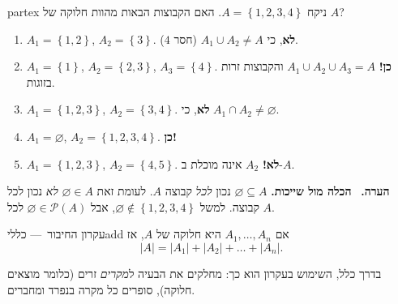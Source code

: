 \documentclass[11pt,a4paper]{report}
\newenvironment{remark}{\par\smallskip\noindent\textsf{\textbf{הערה.}}\ }{\par\smallskip}
\newcommand{\flag}{\tikz[baseline=-0.1ex,x=0.9ex,y=0.9ex]{\draw[line width=0.5pt] (0,-0.3)--(0,1.6); \fill (0,1.6)--(1.2,1.2)--(0,0.8)--cycle;}}
\newcounter{todo}
\newcommand{\addtodo}[1]{\refstepcounter{todo}%
  \addcontentsline{tdo}{todo}{\protect\numberline{\thetodo}#1}}
\newcommand{\needcheck}[1]{\addtodo{#1}%
  {\color{todoc}\sffamily\small\,[\textbf{\flag{}\,\thetodo\ לבדיקה:} #1]\,}}
\renewcommand{\needcheck}[1]{}
\newcommand{\set}[1]{\left\{#1\right\}}
\newcommand{\Pow}{\mathcal{P}}
\renewcommand{\emptyset}{\varnothing}
\newcommand{\dash}{{\rmfamily —}}
\begin{document}
\begin{example}{}{partex}
ניקח $A=\set{1,2,3,4}$. האם הקבוצות הבאות מהוות חלוקה של $A$?
\begin{enumerate}[label=(\alph*)]
  \item $A_1=\set{1,2}$, $A_2=\set{3}$. \quad \textbf{לא}, כי $A_1\cup A_2\neq A$ (חסר $4$).
  \item $A_1=\set{1}$, $A_2=\set{2,3}$, $A_3=\set{4}$. \quad \textbf{כן!} $A_1\cup A_2\cup A_3=A$ והקבוצות זרות בזוגות.
  \item $A_1=\set{1,2,3}$, $A_2=\set{3,4}$. \quad \textbf{לא}, כי $A_1\cap A_2\neq\emptyset$.
  \item $A_1=\emptyset$, $A_2=\set{1,2,3,4}$. \quad \textbf{כן!}
  \item $A_1=\set{1,2,3}$, $A_2=\set{4,5}$. \quad \textbf{לא!} $A_2$ אינה מוכלת ב-$A$.
\end{enumerate}
\needcheck{בסעיפים (א) ו-(ב) נכתב ברשימות $A_1\cap A_2\neq A$ ו-$A_1\cap A_2\cap A_3=A$; תיקנתי ל-$\cup$ (איחוד)}\par
\needcheck{בסעיף (ד) הקבוצה הריקה מתקבלת כחלק בחלוקה. בספרים רבים דורשים שכל $A_i$ יהיה לא ריק. לוודא מה המוסכמה בקורס}
\end{example}

\begin{remark}
\textbf{הכלה מול שייכות.} $\emptyset\subseteq A$ נכון \emph{לכל} קבוצה $A$. לעומת זאת $\emptyset\in A$ \emph{לא} נכון לכל קבוצה. למשל $\emptyset\notin\set{1,2,3,4}$, אבל $\emptyset\in\Pow(A)$ לכל $A$.
\end{remark}

\begin{principle}{עקרון החיבור~\dash{} כללי}{add}
אם $A_1,\dots,A_n$ היא חלוקה של $A$, אז
\[
  |A|=|A_1|+|A_2|+\dots+|A_n|.
\]
\end{principle}

בדרך כלל, השימוש בעקרון הוא כך: מחלקים את הבעיה ל\emph{מקרים} זרים (כלומר מוצאים חלוקה), סופרים כל מקרה בנפרד ומחברים.
\end{document}
